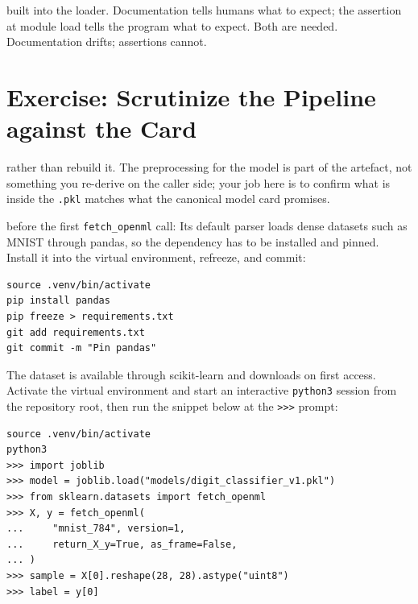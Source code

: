 
 built into the
loader.
Documentation tells humans what to expect; the assertion at module load
tells the program what to expect.
Both are needed.
Documentation drifts; assertions cannot.



\newpage
\section{Exercise: Scrutinize the Pipeline against the Card}

 rather than rebuild it.
The preprocessing for the model is part of the artefact, not something
you re-derive on the caller side; your job here is to confirm what is
inside the \texttt{.pkl} matches what the canonical model card promises.

 before the first
\texttt{fetch\_openml} call: Its default parser loads dense datasets such
as MNIST through pandas, so the dependency has to be installed and pinned.
Install it into the virtual environment, refreeze, and commit:

\begin{verbatim}
source .venv/bin/activate
pip install pandas
pip freeze > requirements.txt
git add requirements.txt
git commit -m "Pin pandas"
\end{verbatim}

The dataset is available through scikit-learn and downloads on first
access. Activate the virtual environment and start an interactive
\texttt{python3} session from the repository root, then run the snippet
below at the \texttt{>>>} prompt:

\begin{verbatim}
source .venv/bin/activate
python3
>>> import joblib
>>> model = joblib.load("models/digit_classifier_v1.pkl")
>>> from sklearn.datasets import fetch_openml
>>> X, y = fetch_openml(
...     "mnist_784", version=1,
...     return_X_y=True, as_frame=False,
... )
>>> sample = X[0].reshape(28, 28).astype("uint8")
>>> label = y[0]
\end{verbatim}

